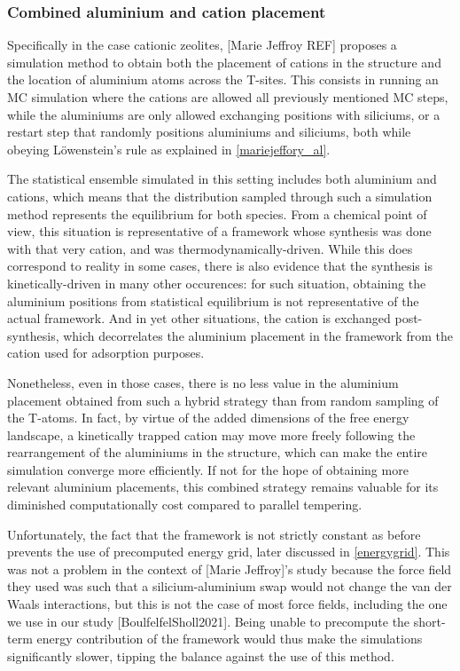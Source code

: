\documentclass[main.tex]{subfiles}
\begin{document}
\subsubsection{Combined aluminium and cation placement} %

Specifically in the case cationic zeolites, [Marie Jeffroy REF] proposes a simulation method to obtain both the placement of cations in the structure and the location of aluminium atoms across the T-sites. This consists in running an MC simulation where the cations are allowed all previously mentioned MC steps, while the aluminiums are only allowed exchanging positions with siliciums, or a restart step that randomly positions aluminiums and siliciums, both while obeying L\"owenstein's rule as explained in \autoref{mariejeffory_al}.

The statistical ensemble simulated in this setting includes both aluminium and cations, which means that the distribution sampled through such a simulation method represents the equilibrium for both species. From a chemical point of view, this situation is representative of a framework whose synthesis was done with that very cation, and was thermodynamically-driven. While this does correspond to reality in some cases, there is also evidence that the synthesis is kinetically-driven in many other occurences: for such situation, obtaining the aluminium positions from statistical equilibrium is not representative of the actual framework. And in yet other situations, the cation is exchanged post-synthesis, which decorrelates the aluminium placement in the framework from the cation used for adsorption purposes.

Nonetheless, even in those cases, there is no less value in the aluminium placement obtained from such a hybrid strategy than from random sampling of the T-atoms. In fact, by virtue of the added dimensions of the free energy landscape, a kinetically trapped cation may move more freely following the rearrangement of the aluminiums in the structure, which can make the entire simulation converge more efficiently. If not for the hope of obtaining more relevant aluminium placements, this combined strategy remains valuable for its diminished computationally cost compared to parallel tempering.

Unfortunately, the fact that the framework is not strictly constant as before prevents the use of precomputed energy grid, later discussed in \autoref{energygrid}. This was not a problem in the context of [Marie Jeffroy]'s study because the force field they used was such that a silicium-aluminium swap would not change the van der Waals interactions, but this is not the case of most force fields, including the one we use in our study [BoulfelfelSholl2021]. Being unable to precompute the short-term energy contribution of the framework would thus make the simulations significantly slower, tipping the balance against the use of this method.
\end{document}
